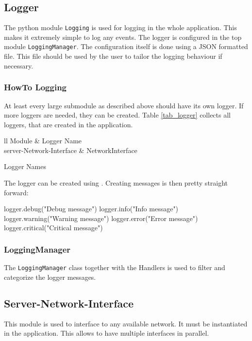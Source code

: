 \FloatBarrier
\subsection{Logger}
The python module \texttt{Logging} is used for logging in the whole application. This makes it extremely simple to log any events. The logger is configured in the top module \texttt{LoggingManager}. The configuration itself is done using a \ac{JSON} formatted file. This file should be used by the user to tailor the logging behaviour if necessary. 
\subsubsection{HowTo Logging}
At least every large submodule as described above should have its own logger. If more loggers are needed, they can be created. Table  \ref{tab_logger} collects all loggers, that are created in the application. 
\begin{table}[h!]
	\centering
	\begin{zebratabular}{ll}
		Module &
		Logger Name \\
		server-Network-Interface & NetworkInterface  \\
	\end{zebratabular}
	\caption{Logger Names}
	\label{tab_logger}
\end{table}

The logger can be created using . Creating messages is then pretty straight forward: 
\begin{python}
logger.debug("Debug message")
logger.info("Info message")
logger.warning("Warning message")
logger.error("Error message")
logger.critical("Critical message")
\end{python}

\subsubsection{LoggingManager}
The \texttt{LoggingManager} class together with the Handlers is used to filter and categorize the logger messages. 

\subsection{Server-Network-Interface}

This module is used to interface to any available network. It must be instantiated in the application. This allows to have multiple interfaces in parallel.

